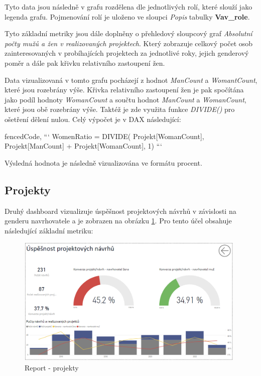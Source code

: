 \documentclass[
  digital,     %
  twoside,     %
  lof,         %
  lot,         %
]{fithesis4}
\begin{document}
Tyto data jsou následně v grafu rozdělena dle jednotlivých rolí, které slouží jako legenda grafu. Pojmenování rolí je uloženo ve sloupci \emph{Popis} tabulky \textbf{Vav\_role}. 


\vspace{5}
Tyto základní metriky jsou dále doplněny o přehledový sloupcový graf \emph{Absolutní počty mužů a žen v realizovaných projektech}. Který zobrazuje celkový počet osob zainteresovaných v probíhajících projektech za jednotlivé roky, jejich genderový poměr a dále pak křivku relativního zastoupení žen.  

Data vizualizovaná v tomto grafu pocházejí z hodnot \emph{ManCount} a \emph{WomantCount}, které jsou rozebrány výše. Křivka relativního zastoupení žen je pak spočítána jako podíl hodnoty \emph{WomanCount} a součtu hodnot \emph{ManCount} a \emph{WomanCount}, které jsou obě rozebrány výše. Taktéž je zde využita funkce \emph{DIVIDE()} pro ošetření dělení nulou. Celý výpočet je v DAX následující:

\begin{tcolorbox}
\begin{markdown*}{%
  fencedCode,
}
```
WomenRatio = DIVIDE(
        Projekt[WomanCount], 
        Projekt[ManCount] + Projekt[WomanCount],
        1)
```
\end{markdown*}
\end{tcolorbox}
    
Výsledná hodnota je následně vizualizována ve formátu procent. 

\subsection{Projekty}
Druhý dashboard vizualizuje úspěšnost projektových návrhů v závislosti na genderu navrhovatele a je zobrazen na obrázku \ref{fig:projects}. Pro tento účel obsahuje následující základní metriku:

    \begin{figure}[t]
        \begin{center}
            \includegraphics[width=11cm]{img/projects.png}
        \end{center}
        \caption{Report - projekty}
        \label{fig:projects}
    \end{figure}
\end{document}
